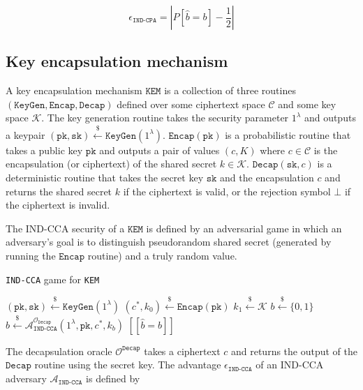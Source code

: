 \documentclass[floatrow,journal=tches,submission]{iacrtrans}
\newcommand{\monospace}{\texttt}
\newcommand{\keygen}{\monospace{KeyGen}}
\newcommand{\kem}{\monospace{KEM}}
\newcommand{\encap}{\monospace{Encap}}
\newcommand{\decap}{\monospace{Decap}}
\newcommand{\pk}{\monospace{pk}}
\newcommand{\sk}{\monospace{sk}}
\newcommand{\leftsample}{\stackrel{\$}{\leftarrow}}
\newcommand{\llbrack}{[\![}
\newcommand{\rrbrack}{]\!]}
\newcommand{\norm}[1]{\left\lvert #1 \right\rvert}
\begin{document}
\begin{equation*}
    \epsilon_\monospace{IND-CPA} = \norm{
        P[\hat{b} = b] - \frac{1}{2}
    }
\end{equation*}

\subsection{Key encapsulation mechanism}
A key encapsulation mechanism $\kem$ is a collection of three routines $(\keygen, \encap, \decap)$ defined over some ciphertext space $\mathcal{C}$ and some key space $\mathcal{K}$. The key generation routine takes the security parameter $1^\lambda$ and outputs a keypair $(\pk, \sk) \leftsample \keygen(1^\lambda)$. $\encap(\pk)$ is a probabilistic routine that takes a public key $\pk$ and outputs a pair of values $(c, K)$ where $c \in \mathcal{C}$ is the encapsulation (or ciphertext) of the shared secret $k \in \mathcal{K}$. $\decap(\sk, c)$ is a deterministic routine that takes the secret key $\sk$ and the encapsulation $c$ and returns the shared secret $k$ if the ciphertext is valid, or the rejection symbol $\bot$ if the ciphertext is invalid.

The IND-CCA security of a $\kem$ is defined by an adversarial game in which an adversary's goal is to distinguish pseudorandom shared secret (generated by running the $\encap$ routine) and a truly random value.

\begin{algorithm}
    \caption{
        \monospace{IND-CCA} game for \kem
    }\label{alg:kem-ind-cca-game}
    
    \begin{algorithmic}[1]
        \State $(\pk, \sk) \leftsample \keygen(1^\lambda)$
        \State $(c^\ast, k_0) \leftsample \encap(\pk)$
        \State $k_1 \leftsample \mathcal{K}$
        \State $b \leftsample \{0, 1\}$
        \State $\hat{b} \leftsample \mathcal{A}_\monospace{IND-CCA}^{\mathcal{O}_\decap}(
            1^\lambda, \pk, c^\ast, k_b
        )$
        \State \Return $\llbrack \hat{b} = b \rrbrack$
    \end{algorithmic}
\end{algorithm}

The decapsulation oracle $\mathcal{O}^\decap$ takes a ciphertext $c$ and returns the output of the $\decap$ routine using the secret key. The advantage $\epsilon_\monospace{IND-CCA}$ of an IND-CCA adversary $\mathcal{A}_\monospace{IND-CCA}$ is defined by
\end{document}
